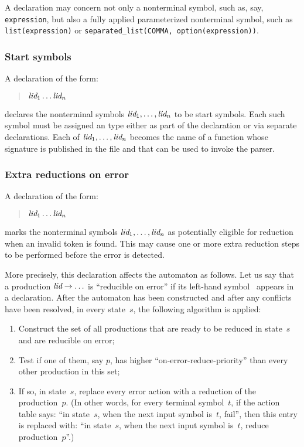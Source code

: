 \documentclass[onecolumn,11pt,nocopyrightspace,preprint]{sigplanconf}
\begin{document}
A \dtype declaration may concern not only a nonterminal symbol, such as, say,
\texttt{expression}, but also a fully applied parameterized nonterminal
symbol, such as \texttt{list(expression)} or \texttt{separated\_list(COMMA,
  option(expression))}.

\subsubsection{Start symbols}
\label{sec:start}

A declaration of the form:
\begin{quote}
\dstart \optional{\ocamltype} $\textit{lid}_1 \ldots \textit{lid}_n$
\end{quote}
declares the nonterminal symbols $\textit{lid}_1, \ldots, \textit{lid}_n$ to be
start symbols. Each such symbol must be assigned an \ocaml type either as
part of the \dstart declaration or via separate \dtype declarations. Each
of $\textit{lid}_1, \ldots, \textit{lid}_n$ becomes the name of a function whose
signature is published in the \mli file and that can be used to invoke
the parser.

\subsubsection{Extra reductions on error}
\label{sec:onerrorreduce}

A declaration of the form:
\begin{quote}
\donerrorreduce $\textit{lid}_1 \ldots \textit{lid}_n$
\end{quote}
marks the nonterminal symbols $\textit{lid}_1, \ldots, \textit{lid}_n$ as
potentially eligible for reduction when an invalid token is found.
This may cause one or more extra reduction steps to be performed
before the error is detected.

More precisely, this declaration affects the automaton as follows. Let us say
that a production $\textit{lid} \rightarrow \ldots$ is ``reducible on error'' if
its left-hand symbol~ appears in a \donerrorreduce declaration. After
the automaton has been constructed and after any conflicts have been resolved,
in every state~$s$, the following algorithm is applied:
\begin{enumerate}
\item Construct the set of all productions that are ready to be reduced in
  state~$s$ and are reducible on error;
\item Test if one of them, say $p$, has higher ``on-error-reduce-priority''
  than every other production in this set;
\item If so, in state~$s$, replace every error action with a reduction of the
  production~$p$.
(In other words, for every terminal symbol~$t$, if the action table
says: ``in state~$s$, when the next input symbol is~$t$, fail'', then this
entry is replaced with: ``in state~$s$, when the next input symbol
is~$t$, reduce production~$p$''.)
\end{enumerate}
\end{document}
